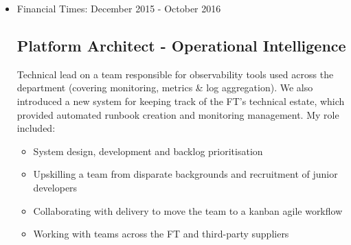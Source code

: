 \documentclass[a4paper]{article}
\newenvironment{detail}{\begin{adjustwidth}{10pt}{}}{\end{adjustwidth}}
\begin{document}
\begin{itemize}
\begin{detail}
\begin{itemize}
	\item Responsible for architectural decisions across a whole programme of work (6 dev teams, in 2 countries)
	\item Designed a suite of new APIs to power an in-house metadata management tool for the newsroom.
	\item Worked closely with stakeholders from Editorial, B2B and Technology departments.
	\item Successfully repositioned our relationship with an existing supplier so they'd take on operational responsibility for the software they were building.
	\item Devised a framework for tracking progress on a multi-year project to decommission a suite of legacy software, in a way that made sense to both delivery managers and engineers.
	\item Took on line management responsibilities for 2 integration engineers.
\end{itemize}
I think my proudest accomplishment here was transforming a team heavily reliant on having an architect to one where engineers felt empowered to make their own architectural decisions.
\end{detail}

\item Financial Times: December 2015 - October 2016
\subsection*{Platform Architect - Operational Intelligence}
\begin{detail}
Technical lead on a team responsible for observability tools used across the department (covering monitoring, metrics \& log aggregation).  We also introduced a new system for keeping track of the FT's technical estate, which provided automated runbook creation and monitoring management.  My role included:
\begin{itemize}
	\item System design, development and backlog prioritisation
	\item Upskilling a team from disparate backgrounds and recruitment of junior developers
	\item Collaborating with delivery to move the team to a kanban agile workflow
	\item Working with teams across the FT and third-party suppliers
\end{itemize}
\end{detail}


\end{itemize}
\end{document}
